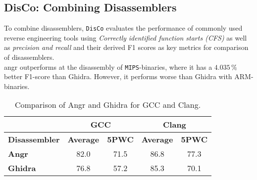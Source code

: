 \documentclass[seminar]{plai}
\begin{document}
\begin{table}[h]
\centering
{}
\caption{Comparison of Angr and Ghidra for Recompile Success Rate and Coverage Equivalence Rate.\cite{decompileBench-comprehensice-benchmark-for-evaluating-decompilers-in-real-world-scenarios}}
\label{sec:decompileBench-comparison}
\end{table}

\subsection{DisCo: Combining Disassemblers}
To combine disassemblers, \texttt{DisCo} evaluates the performance of commonly used reverse engineering tools using \textit{Correctly identified function starts (CFS)} as well as \textit{precision and recall} and their derived F1 scores as key metrics for comparison of disassemblers.\\
angr outperforms at the disassembly of \texttt{MIPS}-binaries, where it has a $4.035\,\%$ better F1-score than Ghidra.
However, it performs worse than Ghidra with \texttt{}{ARM}-binaries.
\begin{table}[H]
\centering
\begin{tabular}{|l|c|c||c|c|}
\hline
 & \multicolumn{2}{c||}{\textbf{GCC}} & \multicolumn{2}{c|}{\textbf{Clang}} \\
\hline
\textbf{Disassembler} & \textbf{Average} & \textbf{5PWC} & \textbf{Average} & \textbf{5PWC} \\
\hline
\textbf{Angr}   & 82.0 & 71.5 & 86.8 & 77.3 \\
\hline
\textbf{Ghidra} & 76.8 & 57.2 & 85.3 & 70.1 \\
\hline
\end{tabular}
\caption{Comparison of Angr and Ghidra for GCC and Clang.\cite{DisCo-combining-disassemblers-for-improved-performance}}
\end{table}
\end{document}
